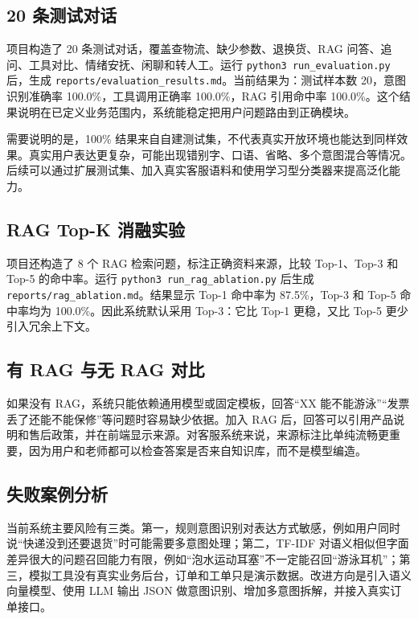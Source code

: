 \documentclass[12pt,a4paper]{ctexart}
\begin{document}
\subsection{20 条测试对话}

项目构造了 20 条测试对话，覆盖查物流、缺少参数、退换货、RAG 问答、追问、工具对比、情绪安抚、闲聊和转人工。运行 \texttt{python3 run\_evaluation.py} 后，生成 \texttt{reports/evaluation\_results.md}。当前结果为：测试样本数 20，意图识别准确率 100.0\%，工具调用正确率 100.0\%，RAG 引用命中率 100.0\%。这个结果说明在已定义业务范围内，系统能稳定把用户问题路由到正确模块。

需要说明的是，100\% 结果来自自建测试集，不代表真实开放环境也能达到同样效果。真实用户表达更复杂，可能出现错别字、口语、省略、多个意图混合等情况。后续可以通过扩展测试集、加入真实客服语料和使用学习型分类器来提高泛化能力。

\subsection{RAG Top-K 消融实验}

项目还构造了 8 个 RAG 检索问题，标注正确资料来源，比较 Top-1、Top-3 和 Top-5 的命中率。运行 \texttt{python3 run\_rag\_ablation.py} 后生成 \texttt{reports/rag\_ablation.md}。结果显示 Top-1 命中率为 87.5\%，Top-3 和 Top-5 命中率均为 100.0\%。因此系统默认采用 Top-3：它比 Top-1 更稳，又比 Top-5 更少引入冗余上下文。

\subsection{有 RAG 与无 RAG 对比}

如果没有 RAG，系统只能依赖通用模型或固定模板，回答“XX 能不能游泳”“发票丢了还能不能保修”等问题时容易缺少依据。加入 RAG 后，回答可以引用产品说明和售后政策，并在前端显示来源。对客服系统来说，来源标注比单纯流畅更重要，因为用户和老师都可以检查答案是否来自知识库，而不是模型编造。

\subsection{失败案例分析}

当前系统主要风险有三类。第一，规则意图识别对表达方式敏感，例如用户同时说“快递没到还要退货”时可能需要多意图处理；第二，TF-IDF 对语义相似但字面差异很大的问题召回能力有限，例如“泡水运动耳塞”不一定能召回“游泳耳机”；第三，模拟工具没有真实业务后台，订单和工单只是演示数据。改进方向是引入语义向量模型、使用 LLM 输出 JSON 做意图识别、增加多意图拆解，并接入真实订单接口。
\end{document}
